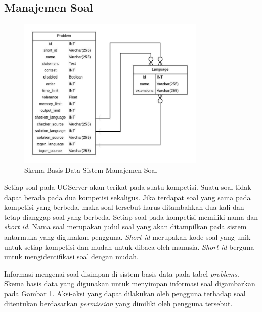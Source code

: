 
\subsection{Manajemen Soal}

\begin{figure}[ht!]
    \centering
    \includegraphics[width=0.8\textwidth]{images/problem-schema}
    \caption{Skema Basis Data Sistem Manajemen Soal}
    \label{fig:problem-schema}
\end{figure}

\par Setiap soal pada UGServer akan terikat pada suatu kompetisi. Suatu soal tidak dapat berada pada dua kompetisi sekaligus. Jika terdapat soal yang sama pada kompetisi yang berbeda, maka soal tersebut harus ditambahkan dua kali dan tetap dianggap soal yang berbeda. Setiap soal pada kompetisi memiliki nama dan \textit{short id}. Nama soal merupakan judul soal yang akan ditampilkan pada sistem antarmuka yang digunakan pengguna. \textit{Short id} merupakan kode soal yang unik untuk setiap kompetisi dan mudah untuk dibaca oleh manusia. \textit{Short id} berguna untuk mengidentifikasi soal dengan mudah.

\par Informasi mengenai soal disimpan di sistem basis data pada tabel \textit{problems}. Skema basis data yang digunakan untuk menyimpan informasi soal digambarkan pada Gambar \ref{fig:problem-schema}. Aksi-aksi yang dapat dilakukan oleh pengguna terhadap soal ditentukan berdasarkan \textit{permission} yang dimiliki oleh pengguna tersebut.

